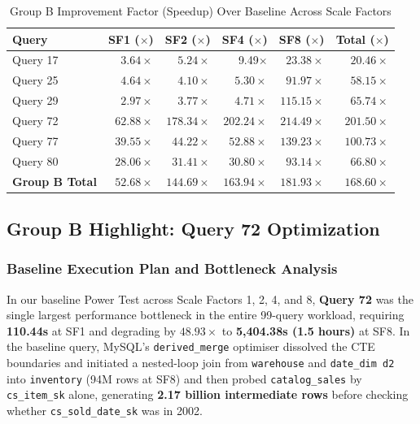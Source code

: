 \documentclass{ULBreport}
\begin{document}
\begin{table}[htbp]
\centering
\caption{Group B Improvement Factor (Speedup) Over Baseline Across Scale Factors}
\label{tab:group_b_results}
\begin{tabular}{@{}lrrrrr@{}}
\toprule
\textbf{Query} & \textbf{SF1 ($\times$)} & \textbf{SF2 ($\times$)} & \textbf{SF4 ($\times$)} & \textbf{SF8 ($\times$)} & \textbf{Total ($\times$)} \\ \midrule
Query 17 & $3.64\times$& $5.24\times$& 9.49$\times$& $23.38\times$& $20.46\times$\\
Query 25 & $4.64\times$& $4.10\times$& $5.30\times$& $91.97\times$& $58.15\times$\\
Query 29 & $2.97\times$& $3.77\times$& $4.71\times$& $115.15\times$& $65.74\times$\\
Query 72 & $62.88\times$& $178.34\times$& $202.24\times$& $214.49\times$& $201.50\times$\\
Query 77 & $39.55\times$& $44.22\times$& $52.88\times$& $139.23\times$& $100.73\times$\\
Query 80 & $28.06\times$& $31.41\times$& $30.80\times$& $93.14\times$& $66.80\times$\\ \midrule
\textbf{Group B Total }& $52.68\times$& $144.69\times$& $163.94\times$& $181.93\times$& $168.60\times$\\ \bottomrule
\end{tabular}
\end{table}

\subsection{Group B Highlight: Query 72 Optimization}

\subsubsection{Baseline Execution Plan and Bottleneck Analysis}
In our baseline Power Test across Scale Factors 1, 2, 4, and 8, \textbf{Query 72} was the single largest performance bottleneck in the entire 99-query workload, requiring \textbf{110.44s} at SF1 and degrading by $48.93\times$ to \textbf{5,404.38s (1.5 hours)} at SF8. In the baseline query, MySQL's \texttt{derived\_merge} optimiser dissolved the CTE boundaries and initiated a nested-loop join from \texttt{warehouse} and \texttt{date\_dim d2} into \texttt{inventory} (94M rows at SF8) and then probed \texttt{catalog\_sales} by \texttt{cs\_item\_sk} alone, generating \textbf{2.17 billion intermediate rows} before checking whether \texttt{cs\_sold\_date\_sk} was in 2002.
\end{document}
